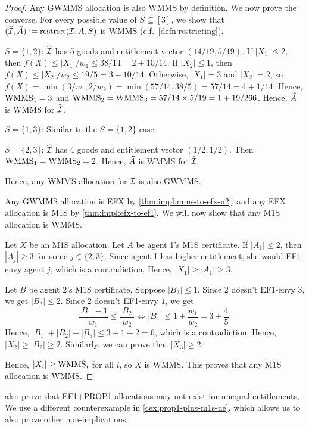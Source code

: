 \begin{proof}
Any GWMMS allocation is also WMMS by definition. We now prove the converse.
For every possible value of $S \subseteq [3]$,
we show that $(\widehat{\mathcal{I}}, \widehat{A}) := \operatorname{restrict}(\mathcal{I}, A, S)$ is WMMS
(c.f.~\cref{defn:restricting}).
\begin{tightenum}
\item $S = \{1, 2\}$:
    $\widehat{\mathcal{I}}$ has 5 goods and entitlement vector $(14/19, 5/19)$.
    If $|X_1| \le 2$, then $f(X) \le |X_1|/w_1 \le 38/14 = 2 + 10/14$.
    If $|X_2| \le 1$, then $f(X) \le |X_2|/w_2 \le 19/5 = 3 + 10/14$.
    Otherwise, $|X_1| = 3$ and $|X_2| = 2$, so $f(X) = \min(3/w_1, 2/w_2) = \min(57/14, 38/5) = 57/14 = 4 + 1/14$.
    Hence, $\mathrm{WMMS}_1 = 3$ and $\mathrm{WMMS}_2 = \mathrm{WMMS}_3 = 57/14 \times 5/19 = 1 + 19/266$.
    Hence, $\widehat{A}$ is WMMS for $\widehat{\mathcal{I}}$.
\item $S = \{1, 3\}$:
    Similar to the $S = \{1, 2\}$ case.
\item $S = \{2, 3\}$:
    $\widehat{\mathcal{I}}$ has 4 goods and entitlement vector $(1/2, 1/2)$.
    Then $\mathrm{WMMS}_1 = \mathrm{WMMS}_2 = 2$.
    Hence, $\widehat{A}$ is WMMS for $\widehat{\mathcal{I}}$.
\end{tightenum}
Hence, any WMMS allocation for $\mathcal{I}$ is also GWMMS.

Any GWMMS allocation is EFX by \cref{thm:impl:mms-to-efx-n2},
and any EFX allocation is M1S by \cref{thm:impl:efx-to-ef1}.
We will now show that any M1S allocation is WMMS.

Let $X$ be an M1S allocation.
Let $A$ be agent 1's M1S certificate.
If $|A_1| \le 2$, then $|A_j| \ge 3$ for some $j \in \{2, 3\}$.
Since agent 1 has higher entitlement, she would EF1-envy agent $j$,
which is a contradiction. Hence, $|X_1| \ge |A_1| \ge 3$.

Let $B$ be agent 2's M1S certificate.
Suppose $|B_2| \le 1$. Since $2$ doesn't EF1-envy $3$, we get $|B_3| \le 2$.
Since $2$ doesn't EF1-envy $1$, we get
\[ \frac{|B_1|-1}{w_1} \le \frac{|B_2|}{w_2} \iff |B_1| \le 1 + \frac{w_1}{w_2} = 3 + \frac{4}{5}. \]
Hence, $|B_1| + |B_2| + |B_3| \le 3 + 1 + 2 = 6$, which is a contradiction.
Hence, $|X_2| \ge |B_2| \ge 2$.
Similarly, we can prove that $|X_3| \ge 2$.

Hence, $|X_i| \ge \mathrm{WMMS}_i$ for all $i$, so $X$ is WMMS.
This proves that any M1S allocation is WMMS.
\end{proof}

\citet{chakraborty2021weighted} also prove that EF1+PROP1 allocations may not exist for unequal entitlements,
We use a different counterexample in \cref{cex:prop1-plus-m1s-ue},
which allows us to also prove other non-implications.

